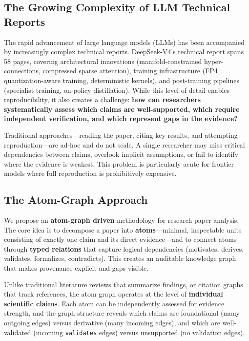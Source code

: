 \documentclass[11pt,a4paper]{article}
\begin{document}
\subsection{The Growing Complexity of LLM Technical Reports}

The rapid advancement of large language models (LLMs) has been accompanied by increasingly complex technical reports. DeepSeek-V4's technical report spans 58 pages, covering architectural innovations (manifold-constrained hyper-connections, compressed sparse attention), training infrastructure (FP4 quantization-aware training, deterministic kernels), and post-training pipelines (specialist training, on-policy distillation). While this level of detail enables reproducibility, it also creates a challenge: \textbf{how can researchers systematically assess which claims are well-supported, which require independent verification, and which represent gaps in the evidence?}

Traditional approaches---reading the paper, citing key results, and attempting reproduction---are ad-hoc and do not scale. A single researcher may miss critical dependencies between claims, overlook implicit assumptions, or fail to identify where the evidence is weakest. This problem is particularly acute for frontier models where full reproduction is prohibitively expensive.

\subsection{The Atom-Graph Approach}

We propose an \textbf{atom-graph driven} methodology for research paper analysis. The core idea is to decompose a paper into \textbf{atoms}---minimal, inspectable units consisting of exactly one claim and its direct evidence---and to connect atoms through \textbf{typed relations} that capture logical dependencies (motivates, derives, validates, formalizes, contradicts). This creates an auditable knowledge graph that makes provenance explicit and gaps visible.

Unlike traditional literature reviews that summarize findings, or citation graphs that track references, the atom graph operates at the level of \textbf{individual scientific claims}. Each atom can be independently assessed for evidence strength, and the graph structure reveals which claims are foundational (many outgoing edges) versus derivative (many incoming edges), and which are well-validated (incoming \texttt{validates} edges) versus unsupported (no validation edges).
\end{document}
